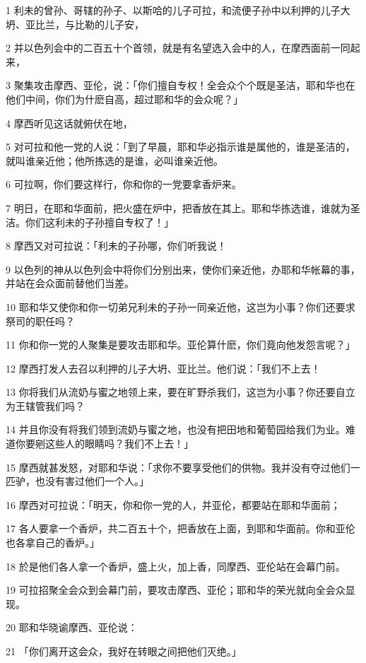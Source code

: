 \par 1 利未的曾孙、哥辖的孙子、以斯哈的儿子可拉，和流便子孙中以利押的儿子大坍、亚比兰，与比勒的儿子安，
\par 2 并以色列会中的二百五十个首领，就是有名望选入会中的人，在摩西面前一同起来，
\par 3 聚集攻击摩西、亚伦，说：「你们擅自专权！全会众个个既是圣洁，耶和华也在他们中间，你们为什麽自高，超过耶和华的会众呢？」
\par 4 摩西听见这话就俯伏在地，
\par 5 对可拉和他一党的人说：「到了早晨，耶和华必指示谁是属他的，谁是圣洁的，就叫谁亲近他；他所拣选的是谁，必叫谁亲近他。
\par 6 可拉啊，你们要这样行，你和你的一党要拿香炉来。
\par 7 明日，在耶和华面前，把火盛在炉中，把香放在其上。耶和华拣选谁，谁就为圣洁。你们这利未的子孙擅自专权了！」
\par 8 摩西又对可拉说：「利未的子孙哪，你们听我说！
\par 9 以色列的神从以色列会中将你们分别出来，使你们亲近他，办耶和华帐幕的事，并站在会众面前替他们当差。
\par 10 耶和华又使你和你一切弟兄利未的子孙一同亲近他，这岂为小事？你们还要求祭司的职任吗？
\par 11 你和你一党的人聚集是要攻击耶和华。亚伦算什麽，你们竟向他发怨言呢？」
\par 12 摩西打发人去召以利押的儿子大坍、亚比兰。他们说：「我们不上去！
\par 13 你将我们从流奶与蜜之地领上来，要在旷野杀我们，这岂为小事？你还要自立为王辖管我们吗？
\par 14 并且你没有将我们领到流奶与蜜之地，也没有把田地和葡萄园给我们为业。难道你要剜这些人的眼睛吗？我们不上去！」
\par 15 摩西就甚发怒，对耶和华说：「求你不要享受他们的供物。我并没有夺过他们一匹驴，也没有害过他们一个人。」
\par 16 摩西对可拉说：「明天，你和你一党的人，并亚伦，都要站在耶和华面前；
\par 17 各人要拿一个香炉，共二百五十个，把香放在上面，到耶和华面前。你和亚伦也各拿自己的香炉。」
\par 18 於是他们各人拿一个香炉，盛上火，加上香，同摩西、亚伦站在会幕门前。
\par 19 可拉招聚全会众到会幕门前，要攻击摩西、亚伦；耶和华的荣光就向全会众显现。
\par 20 耶和华晓谕摩西、亚伦说：
\par 21 「你们离开这会众，我好在转眼之间把他们灭绝。」
